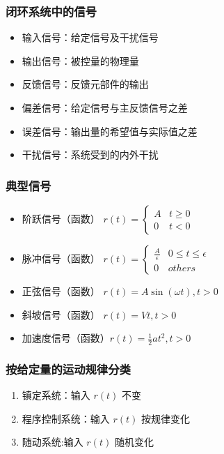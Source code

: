 \documentclass{article}
\begin{document}
\begin{frame}
\frametitle{闭环系统中的信号}
\label{sec-2-1-3}

\begin{itemize}
\item <2->输入信号：给定信号及干扰信号
\item <2->输出信号：被控量的物理量
\item <3->反馈信号：反馈元部件的输出
\item <4->偏差信号：给定信号与主反馈信号之差
\item <4->误差信号：输出量的希望值与实际值之差
\item <5->干扰信号：系统受到的内外干扰
\end{itemize}
\end{frame}
\begin{frame}
\frametitle{典型信号}
\label{sec-2-1-4}

\begin{itemize}
\item <2->阶跃信号（函数）  $r(t)=\begin{cases} A & t\geq 0 \\ 0 & t < 0 \end{cases}$
\item <3->脉冲信号（函数）  $r(t)=\begin{cases}\frac{A}{\epsilon}  & 0\leq t\leq \epsilon\\ 0 & others\end{cases}$
\item <4->正弦信号（函数）  $r(t)=A\sin(\omega t), t>0$
\item <5->斜坡信号（函数）  $r(t)=Vt  ,     t>0$
\item <6->加速度信号（函数）$r(t)=\frac{1}{2}at^2,  t>0$
\end{itemize}
\end{frame}
\begin{frame}
\frametitle{按给定量的运动规律分类}
\label{sec-2-1-5}

\begin{enumerate}
\item <2->镇定系统：输入 $r(t)$ 不变
\item <3->程序控制系统：输入 $r(t)$ 按规律变化
\item <4->随动系统:输入 $r(t)$ 随机变化
\end{enumerate}
\end{frame}
\end{document}
